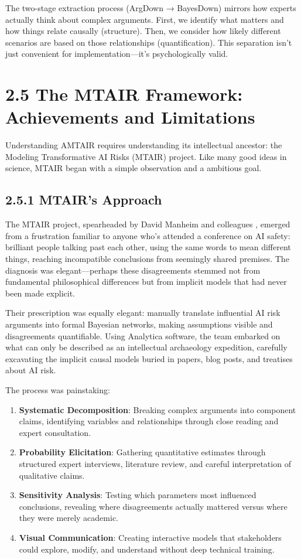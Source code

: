 \documentclass[
  11pt,
  letterpaper,
]{book}
\providecommand{\tightlist}{%
  \setlength{\itemsep}{0pt}\setlength{\parskip}{0pt}}
\begin{document}
The two-stage extraction process (ArgDown → BayesDown) mirrors how
experts actually think about complex arguments. First, we identify what
matters and how things relate causally (structure). Then, we consider
how likely different scenarios are based on those relationships
(quantification). This separation isn't just convenient for
implementation---it's psychologically valid.

\section{2.5 The MTAIR Framework: Achievements and
Limitations}\label{sec-mtair-framework}

Understanding AMTAIR requires understanding its intellectual ancestor:
the Modeling Transformative AI Risks (MTAIR) project. Like many good
ideas in science, MTAIR began with a simple observation and a ambitious
goal.

\subsection{2.5.1 MTAIR's Approach}\label{sec-mtair-approach}

The MTAIR project, spearheaded by David Manheim and colleagues
\textcite{clarke2022}, emerged from a frustration familiar to anyone
who's attended a conference on AI safety: brilliant people talking past
each other, using the same words to mean different things, reaching
incompatible conclusions from seemingly shared premises. The diagnosis
was elegant---perhaps these disagreements stemmed not from fundamental
philosophical differences but from implicit models that had never been
made explicit.

Their prescription was equally elegant: manually translate influential
AI risk arguments into formal Bayesian networks, making assumptions
visible and disagreements quantifiable. Using Analytica software, the
team embarked on what can only be described as an intellectual
archaeology expedition, carefully excavating the implicit causal models
buried in papers, blog posts, and treatises about AI risk.

The process was painstaking:

\begin{enumerate}
\def\labelenumi{\arabic{enumi}.}
\tightlist
\item
  \textbf{Systematic Decomposition}: Breaking complex arguments into
  component claims, identifying variables and relationships through
  close reading and expert consultation.
\item
  \textbf{Probability Elicitation}: Gathering quantitative estimates
  through structured expert interviews, literature review, and careful
  interpretation of qualitative claims.
\item
  \textbf{Sensitivity Analysis}: Testing which parameters most
  influenced conclusions, revealing where disagreements actually
  mattered versus where they were merely academic.
\item
  \textbf{Visual Communication}: Creating interactive models that
  stakeholders could explore, modify, and understand without deep
  technical training.
\end{enumerate}
\end{document}
